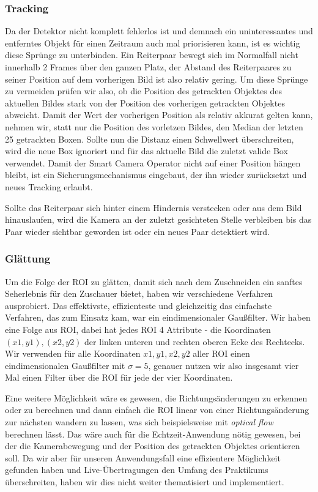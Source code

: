 \subsubsection*{Tracking}
Da der Detektor nicht komplett fehlerlos ist und demnach ein uninteressantes und entferntes Objekt für einen Zeitraum auch mal priorisieren kann, ist es wichtig diese Sprünge zu unterbinden. Ein Reiterpaar bewegt sich im Normalfall nicht innerhalb 2 Frames über den ganzen Platz, der Abstand des Reiterpaares zu seiner Position auf dem vorherigen Bild ist also relativ gering. Um diese Sprünge zu vermeiden prüfen wir also, ob die Position des getrackten Objektes des aktuellen Bildes stark von der Position des vorherigen getrackten Objektes abweicht. Damit der Wert der vorherigen Position als relativ akkurat gelten kann, nehmen wir, statt nur die Position des vorletzen Bildes, den Median der letzten 25 getrackten Boxen. Sollte nun die Distanz einen Schwellwert überschreiten, wird die neue Box ignoriert und für das aktuelle Bild die zuletzt valide Box verwendet. Damit der Smart Camera Operator nicht auf einer Position hängen bleibt, ist ein Sicherungsmechanismus eingebaut, der ihn wieder zurücksetzt und neues Tracking erlaubt.

Sollte das Reiterpaar sich hinter einem Hindernis verstecken oder aus dem Bild hinauslaufen, wird die Kamera an der zuletzt gesichteten Stelle verbleiben bis das Paar wieder sichtbar geworden ist oder ein neues Paar detektiert wird.

\subsubsection*{Glättung}
Um die Folge der ROI zu glätten, damit sich nach dem Zuschneiden ein sanftes Seherlebnis für den Zuschauer bietet, haben wir verschiedene Verfahren ausprobiert.
Das effektivste, effizienteste und gleichzeitig das einfachste Verfahren, das zum Einsatz kam, war ein eindimensionaler Gaußfilter.
Wir haben eine Folge aus ROI, dabei hat jedes ROI 4 Attribute - die Koordinaten $(x1,y1), (x2,y2)$ der linken unteren und rechten oberen Ecke des Rechtecks.
Wir verwenden für alle Koordinaten $x1, y1, x2, y2$ aller ROI einen eindimensionalen Gaußfilter mit $\sigma=5$, genauer nutzen wir also insgesamt vier Mal einen Filter über die ROI für jede der vier Koordinaten.

Eine weitere Möglichkeit wäre es gewesen, die Richtungsänderungen zu erkennen oder zu berechnen und dann einfach die ROI linear von einer Richtungsänderung zur nächsten wandern zu lassen, was sich beispielsweise mit \emph{optical flow} berechnen lässt. Das wäre auch für die Echtzeit-Anwendung nötig gewesen, bei der die Kamerabewegung und der Position des getrackten Objektes orientieren soll.
Da wir aber für unseren Anwendungsfall eine effizientere Möglichkeit gefunden haben und Live-Übertragungen den Umfang des Praktikums überschreiten, haben wir dies nicht weiter thematisiert und implementiert. 
